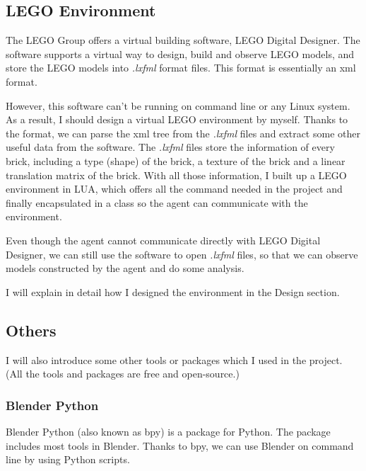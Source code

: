 \documentclass[a4paper]{article}
\begin{document}
            
            
        
        \subsection{LEGO Environment}
        
            The LEGO Group offers a virtual building software, LEGO Digital Designer.\cite{ldd} The software supports a virtual way to design, build and observe LEGO models, and store the LEGO models into \textit{.lxfml} format files. This format is essentially an xml format. 
            
            However, this software can't be running on command line or any Linux system. As a result, I should design a virtual LEGO environment by myself. Thanks to the format, we can parse the xml tree from the \textit{.lxfml} files and extract some other useful data from the software. The \textit{.lxfml} files store the information of every brick, including a type (shape) of the brick, a texture of the brick and a linear translation matrix of the brick. With all those information, I built up a LEGO environment in LUA, which offers all the command needed in the project and finally encapsulated in a class so the agent can communicate with the environment.
            
            Even though the agent cannot communicate directly with LEGO Digital Designer, we can still use the software to open \textit{.lxfml} files, so that we can observe models constructed by the agent and do some analysis. 
            
            I will explain in detail how I designed the environment in the Design section.
        
        \subsection{Others}
            I will also introduce some other tools or packages which I used in the project.
            (All the tools and packages are free and open-source.)
            
            \subsubsection{Blender Python}
                Blender Python (also known as bpy) is a package for Python. The package includes most tools in Blender. Thanks to bpy, we can use Blender on command line by using Python scripts. 
                
\end{document}
